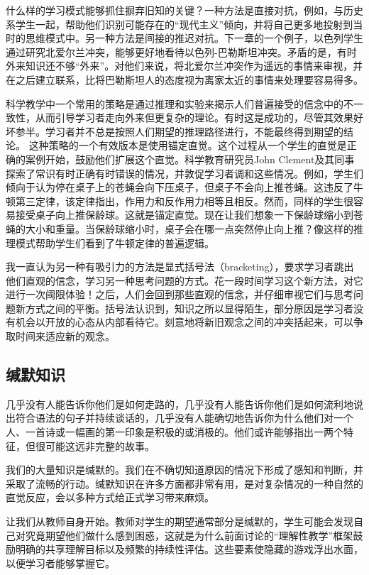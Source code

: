 什么样的学习模式能够抓住摒弃旧知的关键？一种方法是直接对抗，例如，与历史系学生一起，帮助他们识别可能存在的“现代主义”倾向，并将自己更多地投射到当时的思维模式中。另一种方法是间接的推迟对抗。下一章的一个例子，以色列学生通过研究北爱尔兰冲突，能够更好地看待以色列-巴勒斯坦冲突。矛盾的是，有时外来知识还不够“外来”。对他们来说，将北爱尔兰冲突作为遥远的事情来审视，并在之后建立联系，比将巴勒斯坦人的态度视为离家太近的事情来处理要容易得多。

科学教学中一个常用的策略是通过推理和实验来揭示人们普遍接受的信念中的不一致性，从而引导学习者走向外来但更复杂的理论。有时这是成功的，尽管其效果好坏参半。学习者并不总是按照人们期望的推理路径进行，不能最终得到期望的结论。
这种策略的一个有效版本是使用锚定直觉。这个过程从一个学生的直觉是正确的案例开始，鼓励他们扩展这个直觉。科学教育研究员John Clement及其同事探索了常识有时正确有时错误的情况，并敦促学习者调和这些情况。例如，学生们倾向于认为停在桌子上的苍蝇会向下压桌子，但桌子不会向上推苍蝇。这违反了牛顿第三定律，该定律指出，作用力和反作用力相等且相反。然而，同样的学生很容易接受桌子向上推保龄球。这就是锚定直觉。现在让我们想象一下保龄球缩小到苍蝇的大小和重量。当保龄球缩小时，桌子会在哪一点突然停止向上推？像这样的推理模式帮助学生们看到了牛顿定律的普遍逻辑。

我一直认为另一种有吸引力的方法是显式括号法（bracketing），要求学习者跳出他们直观的信念，学习另一种思考问题的方式。花一段时间学习这个新方法，对它进行一次阈限体验！之后，人们会回到那些直观的信念，并仔细审视它们与思考问题新方式之间的平衡。括号法认识到，知识之所以显得陌生，部分原因是学习者没有机会以开放的心态从内部看待它。刻意地将新旧观念之间的冲突括起来，可以争取时间来适应新的观念。

\subsection*{缄默知识}

几乎没有人能告诉你他们是如何走路的，几乎没有人能告诉你他们是如何流利地说出符合语法的句子并持续谈话的，几乎没有人能确切地告诉你为什么他们对一个人、一首诗或一幅画的第一印象是积极的或消极的。他们或许能够指出一两个特征，但很可能这远非完整的故事。

我们的大量知识是缄默的。我们在不确切知道原因的情况下形成了感知和判断，并采取了流畅的行动。缄默知识在许多方面都非常有用，是对复杂情况的一种自然的直觉反应，会以多种方式给正式学习带来麻烦。

让我们从教师自身开始。教师对学生的期望通常部分是缄默的，学生可能会发现自己对究竟期望他们做什么感到困惑，这就是为什么前面讨论的“理解性教学”框架鼓励明确的共享理解目标以及频繁的持续性评估。这些要素使隐藏的游戏浮出水面，以便学习者能够掌握它。

